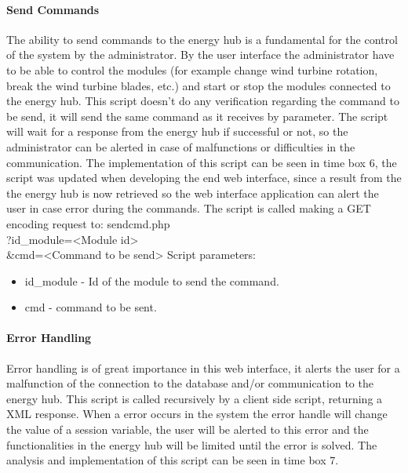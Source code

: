 \paragraph{Send Commands}
The ability to send commands to the energy hub is a fundamental for the control of the system by the administrator. By the user interface the administrator have to be able to control the modules (for example change wind turbine rotation, break the wind turbine blades, etc.) and start or stop the modules connected to the energy hub.
\p
This script doesn't do any verification regarding the command to be send, it will send the same command as it receives by parameter. The script will wait for a response from the energy hub if successful or not, so the administrator can be alerted in case of malfunctions or difficulties in the communication.
\p
The implementation of this script can be seen in time box 6, the script was updated when developing the end web interface, since a result from the the energy hub is now retrieved so the web interface application can alert the user in case error during the commands.
\p
The script is called making a GET encoding request to:
\p
sendcmd.php \\
?id\_module=\textless Module id\textgreater \\
\&cmd=\textless Command to be send\textgreater
\p
Script parameters:
\begin{itemize}
	\item id\_module - Id of the module to send the command.
	\item cmd - command to be sent.
\end{itemize}
\paragraph{Error Handling}
Error handling is of great importance in this web interface, it alerts the user for a malfunction of the connection to the database and/or communication to the energy hub. This script is called recursively by a client side script, returning a XML response. When a error occurs in the system the error handle will change the value of a session variable, the user will be alerted to this error and the functionalities in the energy hub will be limited until the error is solved. The analysis and implementation of this script can be seen in time box 7.
